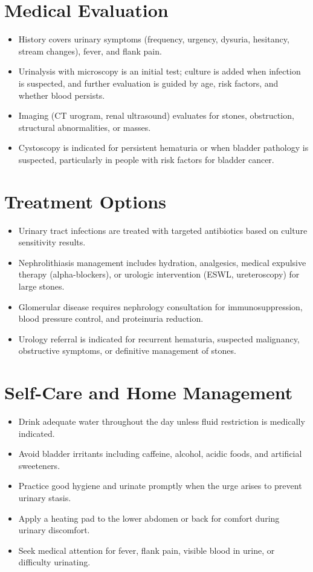 \section*{Medical Evaluation}
\begin{itemize}
  \item History covers urinary symptoms (frequency, urgency, dysuria, hesitancy, stream changes), fever, and flank pain.
  \item Urinalysis with microscopy is an initial test; culture is added when infection is suspected, and further evaluation is guided by age, risk factors, and whether blood persists.
  \item Imaging (CT urogram, renal ultrasound) evaluates for stones, obstruction, structural abnormalities, or masses.
  \item Cystoscopy is indicated for persistent hematuria or when bladder pathology is suspected, particularly in people with risk factors for bladder cancer.
\end{itemize}

\section*{Treatment Options}
\begin{itemize}
  \item Urinary tract infections are treated with targeted antibiotics based on culture sensitivity results.
  \item Nephrolithiasis management includes hydration, analgesics, medical expulsive therapy (alpha-blockers), or urologic intervention (ESWL, ureteroscopy) for large stones.
  \item Glomerular disease requires nephrology consultation for immunosuppression, blood pressure control, and proteinuria reduction.
  \item Urology referral is indicated for recurrent hematuria, suspected malignancy, obstructive symptoms, or definitive management of stones.
\end{itemize}

\section*{Self-Care and Home Management}
\begin{itemize}
  \item Drink adequate water throughout the day unless fluid restriction is medically indicated.
  \item Avoid bladder irritants including caffeine, alcohol, acidic foods, and artificial sweeteners.
  \item Practice good hygiene and urinate promptly when the urge arises to prevent urinary stasis.
  \item Apply a heating pad to the lower abdomen or back for comfort during urinary discomfort.
  \item Seek medical attention for fever, flank pain, visible blood in urine, or difficulty urinating.
\end{itemize}

